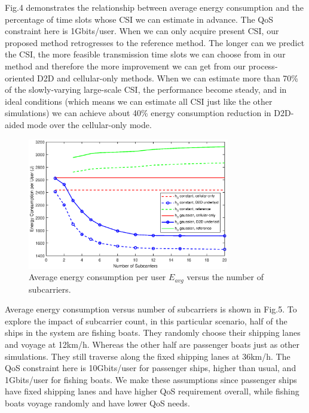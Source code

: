\documentclass{ieeeaccess}
\begin{document}



Fig.4 demonstrates the relationship between average energy consumption and the percentage of time slots whose CSI we can estimate in advance. The QoS constraint here is 1Gbits/user. 
When we can only acquire present CSI, our proposed method retrogresses to the reference method. The longer can we predict the CSI, the more feasible transmission time slots we can choose from in our method and therefore the more improvement we can get from our process-oriented D2D and cellular-only methods. When we can estimate more than 70\% of the slowly-varying large-scale CSI, the performance become steady, and in ideal conditions (which means we can estimate all CSI just like the other simulations) we can achieve about 40\% energy consumption reduction in D2D-aided mode over the cellular-only mode.

\begin{figure} [htb]
\includegraphics*[width=8.8cm]{Ns.eps}
\caption{Average energy consumption per user $E_{avg}$ versus the number of subcarriers.} \label{fig:5}
\end{figure}




Average energy consumption versus number of subcarriers is shown in Fig.5. To explore the impact of subcarrier count, in this particular scenario, half of the ships in the system are fishing boats. They randomly choose their shipping lanes and voyage at 12km/h. Whereas the other half are passenger boats just as other simulations. They still traverse along the fixed shipping lanes at 36km/h. The QoS constraint here is 10Gbits/user for passenger ships, higher than usual, and 1Gbits/user for fishing boats. We make these assumptions since passenger ships have fixed shipping lanes and have higher QoS requirement overall, while fishing boats voyage randomly and have lower QoS needs.
\end{document}

